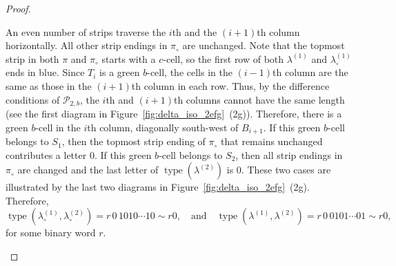 \documentclass[11pt]{article}
\theoremstyle{definition}
\theoremstyle{remark}
\theoremstyle{definition}
\numberwithin{equation}{section}
\newcommand{\type}{\operatorname{type}}
\newcommand\qand{\quad\text{and}\quad}
\begin{document}
\begin{proof}
\begin{enumerate}[label=(2\alph*)]
  An even number of strips traverse the \(i\)th and the \((i+1)\)th
  column horizontally. All other strip endings in \(\pi_\circ\) are
  unchanged. Note that the topmost strip in both \(\pi\) and
  \(\pi_\circ\) starts with a \(c\)-cell, so the first row of both
  \(\lambda^{(1)}\) and \(\lambda_\circ^{(1)}\) ends in blue. Since \( T_i \)
  is a green \(b\)-cell, the cells in the \((i-1)\)th column are the
  same as those in the \((i+1)\)th column in each row. Thus, by the
  difference conditions of \(\mathcal{P}_{2,b}\), the \(i\)th and
  \((i+1)\)th columns cannot have the same length (see the first
  diagram in Figure~\ref{fig:delta_iso_2efg}~(2g)). Therefore, there is
  a green \(b\)-cell in the \(i\)th column, diagonally
  south-west of \( B_{i+1} \). If this green \(b\)-cell belongs to
  \(S_1\), then the topmost strip ending of \(\pi_\circ\) that remains
  unchanged contributes a letter \(0\). If this green \(b\)-cell
  belongs to \(S_2\), then all strip endings in \(\pi_\circ\) are
  changed and the last letter of \(\type(\lambda^{(2)})\) is \(0\). These
  two cases are illustrated by the last two diagrams in
  Figure~\ref{fig:delta_iso_2efg}~(2g). Therefore,
  \[
    \type(\lambda_\circ^{(1)},\lambda_\circ^{(2)})=r\,0\,1010\cdots10\sim r0, \qand \type(\lambda^{(1)},\lambda^{(2)})=r\,0\,0101\cdots01\sim r0,
  \]
  for some binary word \(r\).
  
\begin{figure}[h]
    \centering


\end{figure}
\end{enumerate}
\end{proof}
\end{document}
